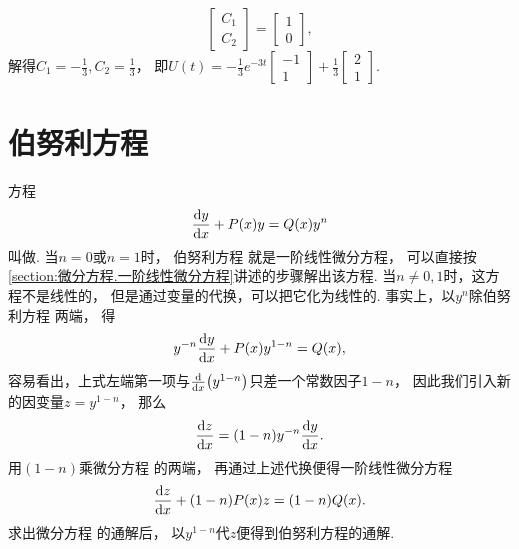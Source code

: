 \begin{example}
\begin{solution}
\begin{equation*}
	\begin{bmatrix}
		C_1 \\ C_2
	\end{bmatrix}
	= \begin{bmatrix}
		1 \\ 0
	\end{bmatrix},
\end{equation*}
解得\(
	C_1 = -\frac13,
	C_2 = \frac13
\)，
即\(
	U(t)
	= -\frac13 e^{-3t} \begin{bmatrix}
		-1 \\ 1
	\end{bmatrix}
	+ \frac13 \begin{bmatrix}
		2 \\ 1
	\end{bmatrix}
\).
\end{solution}
\end{example}

\section{伯努利方程}
方程\begin{equation}\label{equation:微分方程.伯努利方程}
	\dv{y}{x} + P(x) y = Q(x) y^n
\end{equation}
叫做.
当\(n=0\)或\(n=1\)时，
伯努利方程  就是一阶线性微分方程，
可以直接按\cref{section:微分方程.一阶线性微分方程}讲述的步骤解出该方程.
当\(n\neq0,1\)时，这方程不是线性的，
但是通过变量的代换，可以把它化为线性的.
事实上，以\(y^n\)除伯努利方程  两端，
得\begin{equation}\label{equation:微分方程.伯努利方程.中间步骤}
	y^{-n} \dv{y}{x} + P(x) y^{1-n} = Q(x),
\end{equation}
容易看出，上式左端第一项与\(\dv{x}(y^{1-n})\)只差一个常数因子\(1-n\)，
因此我们引入新的因变量\(z = y^{1-n}\)，
那么\begin{equation*}
	\dv{z}{x} = (1-n) y^{-n} \dv{y}{x}.
\end{equation*}
用\((1-n)\)乘微分方程  的两端，
再通过上述代换便得一阶线性微分方程\begin{equation}\label{equation:微分方程.伯努利方程.换元后得到的方程}
	\dv{z}{x} + (1-n) P(x) z = (1-n) Q(x).
\end{equation}
求出微分方程  的通解后，
以\(y^{1-n}\)代\(z\)便得到伯努利方程的通解.

